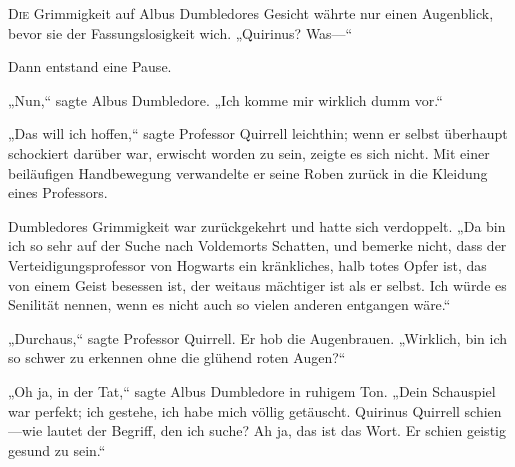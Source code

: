 
\lettrine{D}{ie} Grimmigkeit auf Albus Dumbledores Gesicht währte nur einen Augenblick, bevor sie der Fassungslosigkeit wich.
„Quirinus? Was—“

Dann entstand eine Pause.

„Nun,“ sagte Albus Dumbledore. „Ich komme mir wirklich dumm vor.“

„Das will ich hoffen,“ sagte Professor Quirrell leichthin; wenn er selbst überhaupt schockiert darüber war, erwischt worden zu sein, zeigte es sich nicht. Mit einer beiläufigen Handbewegung verwandelte er seine Roben zurück in die Kleidung eines Professors.

Dumbledores Grimmigkeit war zurückgekehrt und hatte sich verdoppelt.
„Da bin ich so sehr auf der Suche nach Voldemorts Schatten, und bemerke nicht, dass der Verteidigungsprofessor von Hogwarts ein kränkliches, halb totes Opfer ist, das von einem Geist besessen ist, der weitaus mächtiger ist als er selbst. Ich würde es Senilität nennen, wenn es nicht auch so vielen anderen entgangen wäre.“

„Durchaus,“ sagte Professor Quirrell. Er hob die Augenbrauen. „Wirklich, bin ich so schwer zu erkennen ohne die glühend roten Augen?“

„Oh ja, in der Tat,“ sagte Albus Dumbledore in ruhigem Ton. „Dein Schauspiel war perfekt; ich gestehe, ich habe mich völlig getäuscht. Quirinus Quirrell schien—wie lautet der Begriff, den ich suche? Ah ja, das ist das Wort. Er schien geistig gesund zu sein.“

